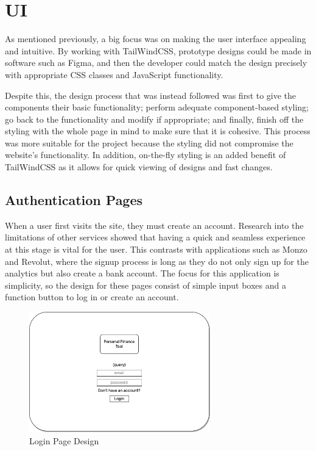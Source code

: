 \section{UI}
\label{sec:ui}
As mentioned previously, a big focus was on making the user interface appealing and intuitive. By working with TailWindCSS, prototype designs could be made in software such as Figma, and then the developer could match the design precisely with appropriate CSS classes and JavaScript functionality.

Despite this, the design process that was instead followed was first to give the components their basic functionality; perform adequate component-based styling; go back to the functionality and modify if appropriate; and finally, finish off the styling with the whole page in mind to make sure that it is cohesive. This process was more suitable for the project because the styling did not compromise the website's functionality. In addition, on-the-fly styling is an added benefit of TailWindCSS as it allows for quick viewing of designs and fast changes.

\subsection{Authentication Pages}
When a user first visits the site, they must create an account. Research into the limitations of other services showed that having a quick and seamless experience at this stage is vital for the user. This contrasts with applications such as Monzo and Revolut, where the signup process is long as they do not only sign up for the analytics but also create a bank account. The focus for this application is simplicity, so the design for these pages consist of simple input boxes and a function button to log in or create an account.

\vspace{2\baselineskip}

\begin{figure}[H]
	\centering
	\includegraphics[width=0.7\textwidth]{images/login_specification.png}
	\caption{Login Page Design}
	\label{fig:LoginPage}
\end{figure}

